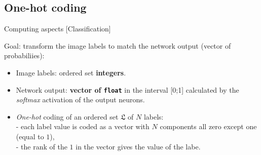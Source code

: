 \documentclass[10pt,serif,mathserif,compress,hyperref={colorlinks}]{beamer}
\begin{document}
\subsection{One-hot coding}

\begin{frame}{Computing aspects [Classification]}

\begin{tcolorbox}[title={\em One-hot} coding of labels]

     Goal: transform the image labels to match the network output (vector of probabiliies):

     {\small
       \begin{itemize}
       \item Image labels: ordered set \textbf{integers}.
       \item Network output: \textbf{vector of \texttt{float}} in the interval [0;1] calculated by the {\em softmax} activation of the output neurons.
       \item {\em One-hot} coding of an ordered set $\mathfrak{L}$ of $N$ labels: \\[1mm]
         - each label value is coded as a vector with $N$ components all zero except one (equal to $1$),\\
         - the rank of the $1$ in the vector gives the value of the labe.
       \end{itemize}
     }
\end{tcolorbox}


\end{frame}
\end{document}
